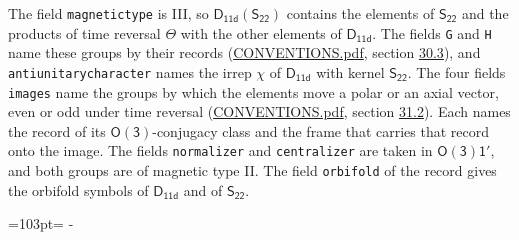 \documentclass[10pt,a4paper]{article}
\newcommand{\needspace}[1]{\par\penalty-100\begingroup\dimen0=#1\relax\dimen2=\pagegoal
  \advance\dimen2-\pagetotal\ifdim\dimen0>\dimen2\relax\ifdim\dimen2>0pt\vfil\break\fi\fi
  \endgroup}
\numberwithin{equation}{section}
\newcommand{\grp}[1]{\mathsf{#1}}
\begin{document}
The field \texttt{magnetictype} is III, so $\grp{D_{11d}}(\grp{S_{22}})$ contains the elements of $\grp{S_{22}}$ and the products of time reversal $\varTheta$ with the other elements of $\grp{D_{11d}}$. The fields \texttt{G} and \texttt{H} name these groups by their records (\href{../../CONVENTIONS.pdf}{CONVENTIONS.pdf}, section \href{../../CONVENTIONS.pdf\#conv.30.3}{30.3}), and \texttt{antiunitarycharacter} names the irrep $\chi$ of $\grp{D_{11d}}$ with kernel $\grp{S_{22}}$. The four fields \texttt{images} name the groups by which the elements move a polar or an axial vector, even or odd under time reversal (\href{../../CONVENTIONS.pdf}{CONVENTIONS.pdf}, section \href{../../CONVENTIONS.pdf\#conv.31.2}{31.2}). Each names the record of its $\grp{O(3)}$-conjugacy class and the frame that carries that record onto the image. The fields \texttt{normalizer} and \texttt{centralizer} are taken in $\grp{O(3)1'}$, and both groups are of magnetic type II. The field \texttt{orbifold} of the record gives the orbifold symbols of $\grp{D_{11d}}$ and of $\grp{S_{22}}$.
\needspace{103pt}
\end{document}
